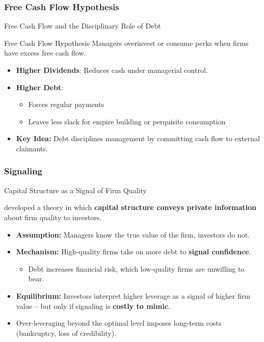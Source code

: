 \subsubsection{Free Cash Flow Hypothesis}
\begin{frame}{Free Cash Flow and the Disciplinary Role of Debt}
	
	\begin{block}{Free Cash Flow Hypothesis \parencite{jensen1986agency}}
		Managers overinvest or consume perks when firms have excess free cash flow.
	\end{block}
	
	\vspace{0.3cm}
	\begin{itemize}
		\item \textbf{Higher Dividends}: Reduces cash under managerial control.
		\item \textbf{Higher Debt}:  
		\begin{itemize}
			\item Forces regular payments
			\item Leaves less slack for empire building or perquisite consumption
		\end{itemize}
		\item \textbf{Key Idea:}  
		Debt disciplines management by committing cash flow to external claimants.
	\end{itemize}
	
\end{frame}

\subsubsection{Signaling}
\begin{frame}{Capital Structure as a Signal of Firm Quality}
	
	\textbf{\textcite{ross1977signaling}} developed a theory in which \textbf{capital structure conveys private information} about firm quality to investors.
	
	\vspace{0.3cm}
	\begin{itemize}
		\item \textbf{Assumption:}  
		Managers know the true value of the firm, investors do not.
		
		\item \textbf{Mechanism:}  
		High-quality firms take on more debt to \textbf{signal confidence}.  
		\begin{itemize}
			\item Debt increases financial risk, which low-quality firms are unwilling to bear.
		\end{itemize}
		
		\item \textbf{Equilibrium:}  
		Investors interpret higher leverage as a signal of higher firm value -- but only if signaling is \textbf{costly to mimic}.
		
		\item Over-leveraging beyond the optimal level imposes long-term costs (bankruptcy, loss of credibility).
	\end{itemize}
	
\end{frame}

